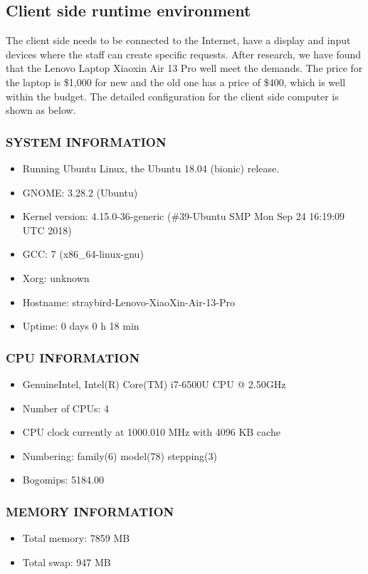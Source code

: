 \documentclass[a4paper]{report}
\begin{document}
\subsection{Client side runtime environment}
The client side needs to be connected to the Internet, have a display and input devices where the staff can create specific requests. After research, we have found that the Lenovo Laptop Xiaoxin Air 13 Pro well meet the demands. The price for the laptop is \$1,000 for new and the old one has a price of \$400, which is well within the budget. The detailed configuration for the client side computer is shown as below.
\subsubsection{SYSTEM INFORMATION}
\begin{itemize}
\item Running Ubuntu Linux, the Ubuntu 18.04 (bionic) release.
\item GNOME: 3.28.2 (Ubuntu)
\item Kernel version: 4.15.0-36-generic (\#39-Ubuntu SMP Mon Sep 24 16:19:09 UTC 2018)
\item	GCC: 7 (x86\_64-linux-gnu)
\item	Xorg: unknown
\item	Hostname: straybird-Lenovo-XiaoXin-Air-13-Pro
\item	Uptime: 0 days 0 h 18 min
\end{itemize}
\subsubsection{CPU INFORMATION}
\begin{itemize}
\item GenuineIntel, Intel(R) Core(TM) i7-6500U CPU @ 2.50GHz
\item Number of CPUs: 4
\item CPU clock currently at 1000.010 MHz with 4096 KB cache
\item Numbering: family(6) model(78) stepping(3)
\item Bogomips: 5184.00
\end{itemize}
\subsubsection{MEMORY INFORMATION}
\begin{itemize}
\item Total memory: 7859 MB
\item Total swap: 947 MB
\end{itemize}
\end{document}
